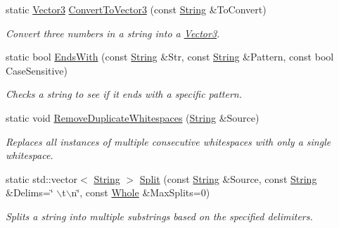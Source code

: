 \begin{DoxyCompactItemize}
static \hyperlink{classMezzanine_1_1Vector3}{Vector3} \hyperlink{classMezzanine_1_1StringTool_a973b0f74c27d75ac0a86990297305b4c}{ConvertToVector3} (const \hyperlink{namespaceMezzanine_acf9fcc130e6ebf08e3d8491aebcf1c86}{String} \&ToConvert)
\begin{DoxyCompactList}\small\item\em Convert three numbers in a string into a \hyperlink{classMezzanine_1_1Vector3}{Vector3}. \item\end{DoxyCompactList}\item 
static bool \hyperlink{classMezzanine_1_1StringTool_aa2fe09e887ce043f27de5bde382a097b}{EndsWith} (const \hyperlink{namespaceMezzanine_acf9fcc130e6ebf08e3d8491aebcf1c86}{String} \&Str, const \hyperlink{namespaceMezzanine_acf9fcc130e6ebf08e3d8491aebcf1c86}{String} \&Pattern, const bool CaseSensitive)
\begin{DoxyCompactList}\small\item\em Checks a string to see if it ends with a specific pattern. \item\end{DoxyCompactList}\item 
static void \hyperlink{classMezzanine_1_1StringTool_a99c3458b983bce002f2d8866c9234106}{RemoveDuplicateWhitespaces} (\hyperlink{namespaceMezzanine_acf9fcc130e6ebf08e3d8491aebcf1c86}{String} \&Source)
\begin{DoxyCompactList}\small\item\em Replaces all instances of multiple consecutive whitespaces with only a single whitespace. \item\end{DoxyCompactList}\item 
static std::vector$<$ \hyperlink{namespaceMezzanine_acf9fcc130e6ebf08e3d8491aebcf1c86}{String} $>$ \hyperlink{classMezzanine_1_1StringTool_afade89bdf1ce7a883e8e2ba3e865f9bf}{Split} (const \hyperlink{namespaceMezzanine_acf9fcc130e6ebf08e3d8491aebcf1c86}{String} \&Source, const \hyperlink{namespaceMezzanine_acf9fcc130e6ebf08e3d8491aebcf1c86}{String} \&Delims=\char`\"{} $\backslash$t$\backslash$n\char`\"{}, const \hyperlink{namespaceMezzanine_adcbb6ce6d1eb4379d109e51171e2e493}{Whole} \&MaxSplits=0)
\begin{DoxyCompactList}\small\item\em Splits a string into multiple substrings based on the specified delimiters. \item\end{DoxyCompactList}\item 

\end{DoxyCompactItemize}
